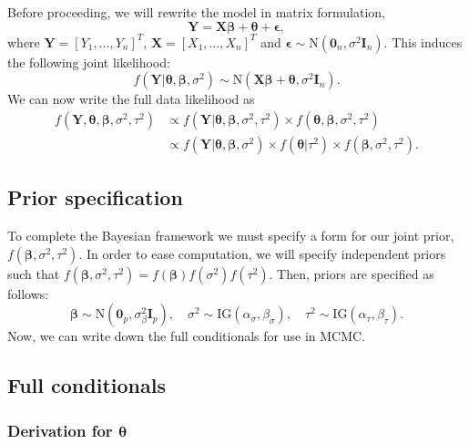 \documentclass[12pt]{article} %
\theoremstyle{plain}
\theoremstyle{definition}
\theoremstyle{remark}
\begin{document}
Before proceeding, we will rewrite the model in matrix formulation,
$$\mathbf{Y}=\mathbf{X}\boldsymbol{\beta}+\boldsymbol{\theta}+\boldsymbol{\epsilon},$$
where $\mathbf{Y}=[Y_1,\ldots,Y_n]^T$, $\mathbf{X}=[X_1,\ldots,X_n]^T$ and $\boldsymbol{\epsilon}\sim \text{N}\left(\boldsymbol{0}_n,\sigma^2 \mathbf{I}_n\right)$. This induces the following joint likelihood:
$$f\left(\mathbf{Y}|\boldsymbol{\theta},\boldsymbol{\beta},\sigma^2\right) \sim \text{N}\left(\mathbf{X}\boldsymbol{\beta}+\boldsymbol{\theta},\sigma^2 \mathbf{I}_n\right).$$
We can now write the full data likelihood as
\begin{align*}
f\left(\mathbf{Y},\boldsymbol{\theta},\boldsymbol{\beta},\sigma^2,\tau^2\right) &\propto f\left(\mathbf{Y}|\boldsymbol{\theta},\boldsymbol{\beta},\sigma^2,\tau^2\right) \times f\left(\boldsymbol{\theta},\boldsymbol{\beta},\sigma^2,\tau^2\right)\\
&\propto f\left(\mathbf{Y}|\boldsymbol{\theta},\boldsymbol{\beta},\sigma^2\right) \times f\left(\boldsymbol{\theta}|\tau^2\right) \times f\left(\boldsymbol{\beta},\sigma^2,\tau^2\right).
\end{align*}

\subsection*{Prior specification}

To complete the Bayesian framework we must specify a form for our joint prior, $f\left(\boldsymbol{\beta},\sigma^2,\tau^2\right)$. In order to ease computation, we will specify independent priors such that $f\left(\boldsymbol{\beta},\sigma^2,\tau^2\right)=f\left(\boldsymbol{\beta}\right)f\left(\sigma^2\right)f\left(\tau^2\right)$. Then, priors are specified as follows:
$$\boldsymbol{\beta} \sim \text{N}\left(\boldsymbol{0}_p,\sigma_{\beta}^2 \mathbf{I}_p\right),\quad \sigma^2 \sim \text{IG}\left(\alpha_{\sigma},\beta_{\sigma}\right),\quad \tau^2 \sim \text{IG}\left(\alpha_{\tau},\beta_{\tau}\right).$$
Now, we can write down the full conditionals for use in MCMC.

\subsection*{Full conditionals}

\subsubsection*{Derivation for $\boldsymbol{\theta}$}
\end{document}
